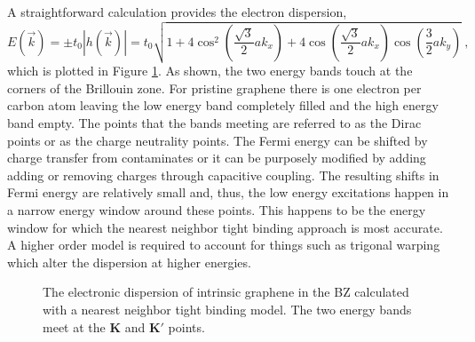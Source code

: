 A straightforward calculation provides the electron dispersion,
\begin{equation*}
	E(\vec{k})=\pm t_0 |h(\vec{k})|=t_0 \sqrt{1+4 \cos^2 \left(\frac{\sqrt{3}}{2} a k_x\right)
		+4 \cos\left(\frac{\sqrt{3}}{2} a k_x \right) \cos \left(\frac{3}{2} a k_y\right)} \ ,
\end{equation*}
which is plotted in Figure \ref{fig:TB:Dispersion}.
As shown, the two energy bands touch at the corners of the Brillouin zone.
For pristine graphene there is one electron per carbon atom leaving the low energy band completely filled and the high energy band empty.
The points that the bands meeting are referred to as the Dirac points or as the charge neutrality points.
The Fermi energy can be shifted by charge transfer from contaminates or it can be purposely modified by adding adding or removing charges through capacitive coupling.
The resulting shifts in Fermi energy are relatively small and, thus, the low energy excitations happen in a narrow energy window around these points.
This happens to be the energy window for which the nearest neighbor tight binding approach is most accurate.
A higher order model is required to account for things such as trigonal warping which alter the dispersion at higher energies.

\begin{figure}
	\begin{center}
	
	\end{center}
	\caption[Electronic dispersion of intrinsic graphene]{\label{fig:TB:Dispersion} The electronic dispersion of intrinsic graphene in the BZ calculated with a nearest neighbor tight binding model.  The two energy bands meet at the $\bm{K}$ and $\bm{K'}$ points.}	
\end{figure}


